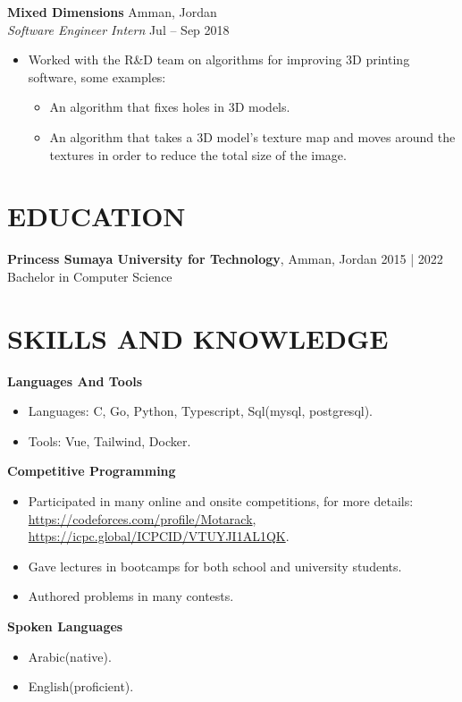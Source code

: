 \documentclass[a4paper,13pt]{extarticle}
\begin{document}
\noindent
\textbf{Mixed Dimensions} \hfill Amman, Jordan\\ %
\textit{Software Engineer Intern} \hfill Jul – Sep 2018 %
\begin{itemize}
    \item Worked with the R\&D team on algorithms for improving 3D printing software, some examples: %
		\begin{itemize}
			\item An algorithm that fixes holes in 3D models.
			\item An algorithm that takes a 3D model's texture map and moves around the textures in order to reduce the total size of the image.
		\end{itemize}
\end{itemize}

\section*{EDUCATION}
\noindent
\textbf{Princess Sumaya University for Technology}, Amman, Jordan \hfill 2015 | 2022\\
Bachelor in Computer Science

\section*{SKILLS AND KNOWLEDGE}
\noindent
\textbf{Languages And Tools}
\begin{itemize}
	\item Languages: C, Go, Python, Typescript, Sql(mysql, postgresql).
	\item Tools: Vue, Tailwind, Docker.
\end{itemize}

\noindent
\textbf{Competitive Programming} %
\begin{itemize}
	\item Participated in many online and onsite competitions, for more details: \url{https://codeforces.com/profile/Motarack}, \url{https://icpc.global/ICPCID/VTUYJI1AL1QK}.
	\item Gave lectures in bootcamps for both school and university students.
	\item Authored problems in many contests.
\end{itemize}

\noindent
\textbf{Spoken Languages} %
\begin{itemize}
	\item Arabic(native).
	\item English(proficient).
\end{itemize}

\end{document}
